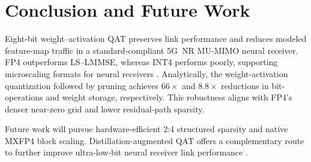 \vspace{-2mm}
\section{Conclusion and Future Work}
\label{conclusion}
Eight-bit weight--activation \gls{QAT} preserves link performance and
reduces modeled feature-map traffic in a standard-compliant 5G~NR
MU-\gls{MIMO} neural receiver. FP4 outperforms \gls{LS}--\gls{LMMSE}, whereas INT4
performs poorly, supporting microscaling formats for neural receivers \cite{rouhani2023microscaling,ocp2023mx}. Analytically, the weight-activation quantization followed by pruning achieves $66\times$ and
$8.8\times$ reductions in bit-operations and weight storage,
respectively. This robustness aligns with FP4's denser near-zero grid
and lower residual-path sparsity.

Future work will pursue hardware-efficient 2:4 structured sparsity and native
MXFP4 block scaling. Distillation-augmented \gls{QAT} offers a
complementary route to further improve ultra-low-bit neural receiver link performance
\cite{yawei_qat_distillation}.